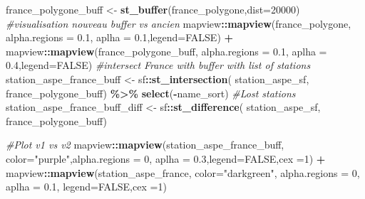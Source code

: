 \documentclass[]{template/RapportPole}
\newenvironment{Shaded}{\begin{snugshade}}{\end{snugshade}}
\newcommand{\AttributeTok}[1]{\textcolor[rgb]{0.13,0.29,0.53}{#1}}
\newcommand{\CommentTok}[1]{\textcolor[rgb]{0.56,0.35,0.01}{\textit{#1}}}
\newcommand{\ConstantTok}[1]{\textcolor[rgb]{0.56,0.35,0.01}{#1}}
\newcommand{\DecValTok}[1]{\textcolor[rgb]{0.00,0.00,0.81}{#1}}
\newcommand{\FloatTok}[1]{\textcolor[rgb]{0.00,0.00,0.81}{#1}}
\newcommand{\FunctionTok}[1]{\textcolor[rgb]{0.13,0.29,0.53}{\textbf{#1}}}
\newcommand{\NormalTok}[1]{#1}
\newcommand{\OtherTok}[1]{\textcolor[rgb]{0.56,0.35,0.01}{#1}}
\newcommand{\SpecialCharTok}[1]{\textcolor[rgb]{0.81,0.36,0.00}{\textbf{#1}}}
\newcommand{\StringTok}[1]{\textcolor[rgb]{0.31,0.60,0.02}{#1}}
\begin{document}
\begin{Shaded}
\begin{Highlighting}[]
\NormalTok{france\_polygone\_buff }\OtherTok{\textless{}{-}} \FunctionTok{st\_buffer}\NormalTok{(france\_polygone,}\AttributeTok{dist=}\DecValTok{20000}\NormalTok{)  }
\CommentTok{\#visualisation nouveau buffer vs ancien}
\NormalTok{mapview}\SpecialCharTok{::}\FunctionTok{mapview}\NormalTok{(france\_polygone, }
                 \AttributeTok{alpha.regions =} \FloatTok{0.1}\NormalTok{, }
                 \AttributeTok{aplha =} \FloatTok{0.1}\NormalTok{,}\AttributeTok{legend=}\ConstantTok{FALSE}\NormalTok{) }\SpecialCharTok{+}
\NormalTok{  mapview}\SpecialCharTok{::}\FunctionTok{mapview}\NormalTok{(france\_polygone\_buff, }
                   \AttributeTok{alpha.regions =} \FloatTok{0.1}\NormalTok{, }
                   \AttributeTok{aplha =} \FloatTok{0.4}\NormalTok{,}\AttributeTok{legend=}\ConstantTok{FALSE}\NormalTok{)}
\CommentTok{\#intersect France with buffer with list of stations}
\NormalTok{station\_aspe\_france\_buff }\OtherTok{\textless{}{-}}\NormalTok{ sf}\SpecialCharTok{::}\FunctionTok{st\_intersection}\NormalTok{( }
\NormalTok{  station\_aspe\_sf, france\_polygone\_buff) }\SpecialCharTok{\%\textgreater{}\%} 
  \FunctionTok{select}\NormalTok{(}\SpecialCharTok{{-}}\NormalTok{name\_sort)}
\CommentTok{\#Lost stations}
\NormalTok{station\_aspe\_france\_buff\_diff }\OtherTok{\textless{}{-}}\NormalTok{ sf}\SpecialCharTok{::}\FunctionTok{st\_difference}\NormalTok{(}
\NormalTok{  station\_aspe\_sf, france\_polygone\_buff)}

\CommentTok{\#Plot v1 vs v2}
\NormalTok{mapview}\SpecialCharTok{::}\FunctionTok{mapview}\NormalTok{(station\_aspe\_france\_buff, }
                 \AttributeTok{color=}\StringTok{"purple"}\NormalTok{,}\AttributeTok{alpha.regions =} \DecValTok{0}\NormalTok{, }
                 \AttributeTok{aplha =} \FloatTok{0.3}\NormalTok{,}\AttributeTok{legend=}\ConstantTok{FALSE}\NormalTok{,}\AttributeTok{cex =}\DecValTok{1}\NormalTok{) }\SpecialCharTok{+}
\NormalTok{mapview}\SpecialCharTok{::}\FunctionTok{mapview}\NormalTok{(station\_aspe\_france, }\AttributeTok{color=}\StringTok{"darkgreen"}\NormalTok{,}
                 \AttributeTok{alpha.regions =} \DecValTok{0}\NormalTok{, }\AttributeTok{aplha =} \FloatTok{0.1}\NormalTok{,}
                 \AttributeTok{legend=}\ConstantTok{FALSE}\NormalTok{,}\AttributeTok{cex =}\DecValTok{1}\NormalTok{)}
\end{Highlighting}
\end{Shaded}
\end{document}
